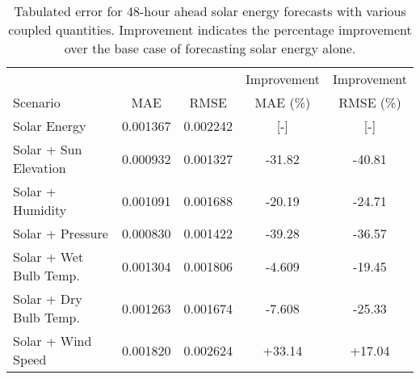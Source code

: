   \begin{table*}[t]
    \centering
    \caption{Tabulated error for 48-hour ahead solar energy forecasts with various coupled quantities. Improvement indicates the percentage improvement over the base case of forecasting solar energy alone.}
    \label{tab:solar48}
    \begin{tabular}{l|c|c|c|c}
      &  & & Improvement & Improvement \\
      Scenario  & MAE & RMSE & MAE (\%) & RMSE (\%)\\
      \hline
      Solar Energy & 0.001367 & 0.002242 & [-] & [-] \\
      Solar + Sun Elevation & 0.000932 & 0.001327 & -31.82& -40.81\\
      Solar + Humidity & 0.001091 & 0.001688 & -20.19& -24.71\\
      Solar + Pressure & 0.000830 & 0.001422 & -39.28& -36.57\\
      Solar + Wet Bulb Temp. & 0.001304 & 0.001806 & -4.609& -19.45\\
      Solar + Dry Bulb Temp. & 0.001263 & 0.001674 & -7.608& -25.33\\
      Solar + Wind Speed & 0.001820 & 0.002624 & +33.14& +17.04\\
    \end{tabular}
  \end{table*}
